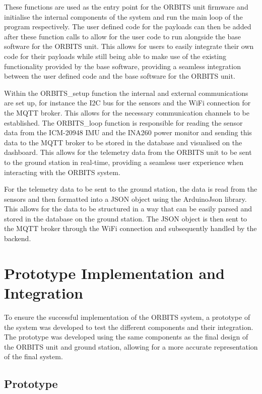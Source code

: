 \documentclass[a4paper,12pt,titlepage]{report}
\begin{document}
These functions are used as the entry point for the ORBITS unit firmware and initialise the internal components of the system and run the main loop of the program respectively. The user defined code for the payloads can then be added after these function calls to allow for the user code to run alongside the base software for the ORBITS unit. This allows for users to easily integrate their own code for their payloads while still being able to make use of the existing functionality provided by the base software, providing a seamless integration between the user defined code and the base software for the ORBITS unit.

Within the ORBITS\_setup function the internal and external communications are set up, for instance the I2C bus for the sensors and the WiFi connection for the MQTT broker. This allows for the necessary communication channels to be established. The ORBITS\_loop function is responsible for reading the sensor data from the ICM-20948 IMU and the INA260 power monitor and sending this data to the MQTT broker to be stored in the database and visualised on the dashboard. This allows for the telemetry data from the ORBITS unit to be sent to the ground station in real-time, providing a seamless user experience when interacting with the ORBITS system.

For the telemetry data to be sent to the ground station, the data is read from the sensors and then formatted into a JSON object using the ArduinoJson library. This allows for the data to be structured in a way that can be easily parsed and stored in the database on the ground station. The JSON object is then sent to the MQTT broker through the WiFi connection and subsequently handled by the backend. 

\chapter{Prototype Implementation and Integration}

To ensure the successful implementation of the ORBITS system, a prototype of the system was developed to test the different components and their integration. The prototype was developed using the same components as the final design of the ORBITS unit and ground station, allowing for a more accurate representation of the final system.

\section{Prototype}
\end{document}
